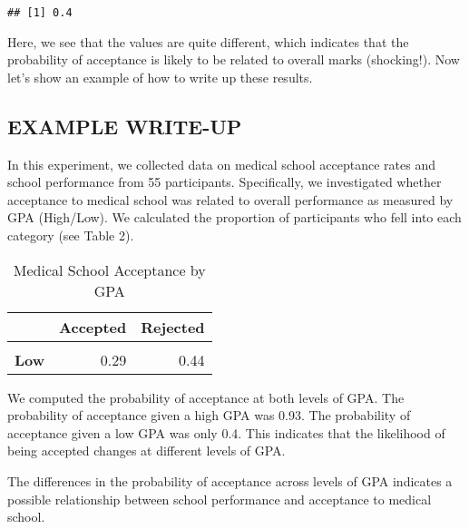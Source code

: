\documentclass[
]{article}
\begin{document}
\begin{verbatim}
## [1] 0.4
\end{verbatim}

Here, we see that the values are quite different, which indicates that
the probability of acceptance is likely to be related to overall marks
(shocking!). Now let's show an example of how to write up these results.

\subsection{EXAMPLE WRITE-UP}\label{example-write-up}

In this experiment, we collected data on medical school acceptance rates
and school performance from 55 participants. Specifically, we
investigated whether acceptance to medical school was related to overall
performance as measured by GPA (High/Low). We calculated the proportion
of participants who fell into each category (see Table 2).

\begin{table}[!h]
\centering
\caption{\label{tab:unnamed-chunk-14}Medical School Acceptance by GPA}
\centering
\begin{tabular}[t]{>{}lrr}
\toprule
\textbf{ } & \textbf{Accepted} & \textbf{Rejected}\\
\midrule
\textbf{\cellcolor{gray!10}{High}} & \cellcolor{gray!10}{0.25} & \cellcolor{gray!10}{0.02}\\
\textbf{Low} & 0.29 & 0.44\\
\bottomrule
\end{tabular}
\end{table}

We computed the probability of acceptance at both levels of GPA. The
probability of acceptance given a high GPA was 0.93. The probability of
acceptance given a low GPA was only 0.4. This indicates that the
likelihood of being accepted changes at different levels of GPA.

The differences in the probability of acceptance across levels of GPA
indicates a possible relationship between school performance and
acceptance to medical school.
\end{document}
